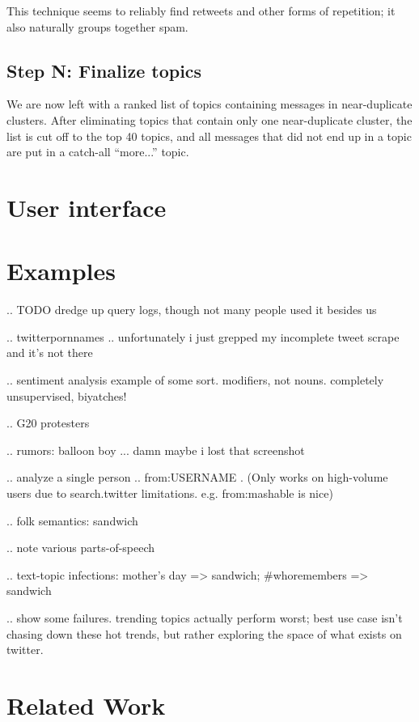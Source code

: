 \documentclass[letterpaper]{article}
\begin{document}
This technique seems to reliably find retweets and other forms of repetition; it also naturally groups together spam.


\subsection{Step N: Finalize topics}

We are now left with a ranked list of topics containing messages in near-duplicate clusters.  After eliminating topics that contain only one near-duplicate cluster, the list is cut off to the top 40 topics, and all messages that did not end up in a topic are put in a catch-all ``more...'' topic.

\section{User interface}

\section{Examples}

.. TODO dredge up query logs, though not many people used it besides us

.. twitterpornnames .. unfortunately i just grepped my incomplete tweet scrape and it's not there

.. sentiment analysis example of some sort.  modifiers, not nouns.  completely unsupervised, biyatches!

.. G20 protesters

.. rumors: balloon boy ... damn maybe i lost that screenshot

.. analyze a single person .. from:USERNAME .   (Only works on high-volume users due to search.twitter limitations.  e.g. from:mashable is nice)

.. folk semantics: sandwich

.. note various parts-of-speech

.. text-topic infections: mother's day => sandwich; \#whoremembers => sandwich

.. show some failures.  trending topics actually perform worst; best use case isn't chasing down these hot trends, but rather exploring the space of what exists on twitter.

\section{Related Work}
\end{document}

